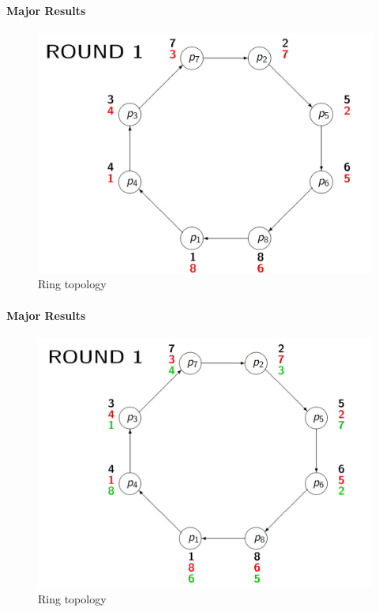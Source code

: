 \documentclass[11pt]{beamer}              %
\begin{document}
\begin{frame}{}
\framesubtitle{Major Results}

\begin{figure}
    \centering
    \includegraphics[scale=0.3]{figures/Screen9.jpg}
    \caption{Ring topology}
    \label{fig:Ring topology}
\end{figure}
\note{
}
\end{frame}



\begin{frame}{}
\framesubtitle{Major Results}

\begin{figure}
    \centering
    \includegraphics[scale=0.3]{figures/Screen10.jpg}
    \caption{Ring topology}
    \label{fig:Ring topology}
\end{figure}
\note{
}
\end{frame}
\end{document}
